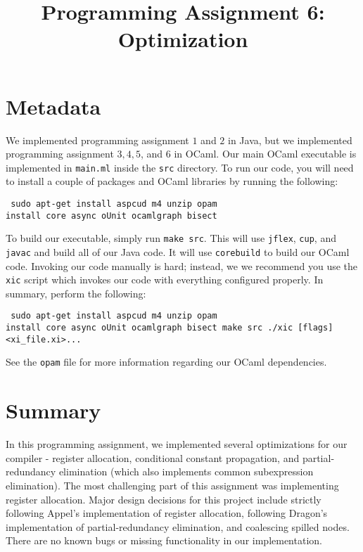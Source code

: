 \documentclass{hw} \title{Programming Assignment 6:\\ Optimization}
\begin{document}
 \maketitle

\section{Metadata}\label{sec:metadata}
We implemented programming assignment $1$ and $2$ in Java, but we implemented
programming assignment $3,4,5$, and $6$ in OCaml. Our main OCaml executable is
implemented in \texttt{main.ml} inside the \texttt{src} directory. To run our
code, you will need to install a couple of packages and OCaml libraries by
running the following:

\begin{center} \begin{BVerbatim} sudo apt-get install aspcud m4 unzip opam
install core async oUnit ocamlgraph bisect \end{BVerbatim} \end{center}

To build our executable, simply run \texttt{make src}. This will use
\texttt{jflex}, \texttt{cup}, and \texttt{javac} and build all of our Java
code. It will use \texttt{corebuild} to build our OCaml code. Invoking our code
manually is hard; instead, we we recommend you use the \texttt{xic} script
which invokes our code with everything configured properly.  In summary,
perform the following:

\begin{center} \begin{BVerbatim} sudo apt-get install aspcud m4 unzip opam
install core async oUnit ocamlgraph bisect make src ./xic [flags]
<xi_file.xi>...  \end{BVerbatim} \end{center}

See the \texttt{opam} file for more information regarding our OCaml
dependencies.


\section{Summary}\label{sec:summary} In this programming assignment, we
implemented several optimizations for our compiler - register allocation,
conditional constant propagation, and partial-redundancy elimination (which
also implements common subexpression elimination).  The most challenging part
of this assignment was implementing register allocation. Major design decisions
for this project include strictly following Appel's implementation of register
allocation, following Dragon's implementation of partial-redundancy
elimination, and coalescing spilled nodes.  There are no known bugs or missing
functionality in our implementation.
\end{document}
